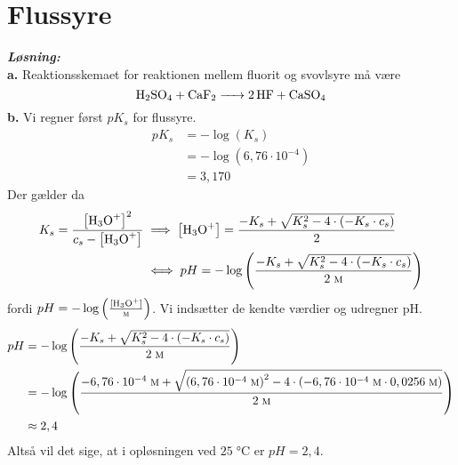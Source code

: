 \documentclass{report}
\newcommand{\sol}{\setlength{\parindent}{0cm}\textbf{\textit{Løsning:}}\setlength{\parindent}{1cm}}
\begin{document}
\section*{Flussyre}
\sol \\
\textbf{a.}
Reaktionsskemaet for reaktionen mellem fluorit og svovlsyre må være
\[
\ce{H2SO4 + CaF2 -> 2HF + CaSO4} 
\] 
\textbf{b.}
Vi regner først $pK_s$ for flussyre. 
\begin{equation*}
\begin{split}
  pK_s&=-\log\left(K_s\right) \\
  &=-\log\left(6,76 \cdot 10^{-4}\right) \\
  &=3,170
\end{split}
\end{equation*}
Der gælder da
\begin{equation*}
\begin{split}
K_s=\frac{\left[\ce{H3O+} \right]^2}{c_s-\left[\ce{H3O+} \right]} &\implies \left[\ce{H3O+} \right]=\frac{-K_s + \sqrt{K_s^2 - 4 \cdot \left(-K_s \cdot c_s\right) } }{2}\\
  &\iff pH=- \log\left(\frac{-K_s + \sqrt{K_s^2 - 4 \cdot \left(-K_s \cdot c_s\right) } }{2 \;\unit{\textsc{m}} }\right) 
\end{split}
\end{equation*}
fordi $pH=-\log\left(\frac{[\ce{H3O+} ]}{\unit{\textsc{m}}}\right) $.
Vi indsætter de kendte værdier og udregner pH.
\begin{equation*}
\begin{split}
  pH&=- \log\left(\frac{-K_s + \sqrt{K_s^2 - 4 \cdot \left(-K_s \cdot c_s\right) } }{2 \;\unit{\textsc{m}} }\right) \\
  &=-\log\left(\frac{-6,76 \cdot 10^{-4}\;\unit{\textsc{m}} + \sqrt{\left(6,76 \cdot 10^{-4}\;\unit{\textsc{m}}\right)^2-4 \cdot \left(-6,76 \cdot 10^{-4}\;\unit{\textsc{m}} \cdot 0,0256 \;\unit{\textsc{m}} \right) } }{2 \;\unit{\textsc{m}} }\right) \\
  &\approx 2,4
\end{split}
\end{equation*}
Altså vil det sige, at i opløsningen ved $25 \;\unit{\celsius} $ er $pH=2,4$. 
\end{document}

